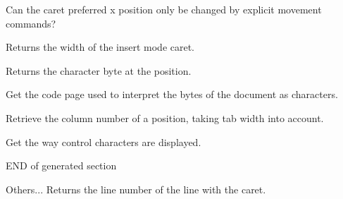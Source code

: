 \label{wxstyledtextctrlgetcaretsticky}


Can the caret preferred x position only be changed by explicit movement commands?


\label{wxstyledtextctrlgetcaretwidth}


Returns the width of the insert mode caret.


\label{wxstyledtextctrlgetcharat}


Returns the character byte at the position.


\label{wxstyledtextctrlgetcodepage}


Get the code page used to interpret the bytes of the document as characters.


\label{wxstyledtextctrlgetcolumn}


Retrieve the column number of a position, taking tab width into account.


\label{wxstyledtextctrlgetcontrolcharsymbol}


Get the way control characters are displayed.


\label{wxstyledtextctrlgetcurline}



\label{wxstyledtextctrlgetcurlineraw}



\label{wxstyledtextctrlgetcurrentline}


END of generated section

Others...
Returns the line number of the line with the caret.


